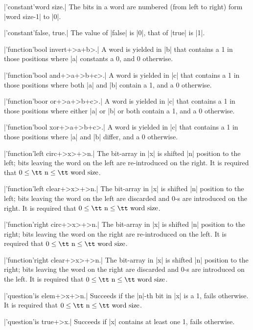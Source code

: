 \documentclass{article}
\begin{document}
\X\pp|'constant'word size.|\Y
The bits in a word are numbered (from left to right) form \pp|word size-1|
to \pp|0|.

\X\pp|'constant'false, true.|\Y
The value of \pp|false| is \pp|0|, that of \pp|true| is \pp|1|.

\X\pp|'function'bool invert+>a+b>.|\Y
A word is yielded in \pp|b| that contains a 1 in those positions where
\pp|a| constants a 0, and 0 otherwise.

\X\pp|'function'bool and+>a+>b+c>.|\Y
A word is yielded in \pp|c| that contains a 1 in those positions where both
\pp|a| and \pp|b| contain a 1, and a 0 otherwise.

\X\pp|'function'boor or+>a+>b+c>.|\Y
A word is yielded in \pp|c| that contains a 1 in those positions where
either \pp|a| or \pp|b| or both contain a 1, and a 0 otherwise.

\X\pp|'function'bool xor+>a+>b+c>.|\Y
A word is yielded in \pp|c| that contains a 1 in those positions where
\pp|a| and \pp|b| differ, and a 0 otherwise.

\smallskip

\X\pp|'function'left circ+>x>+>n.|\Y
The bit-array in \pp|x| is shifted \pp|n| position to the left; bits leaving
the word on the left are re-introduced on the right. It is required that
$0\le\mbox{\tt n}\le\mbox{\tt word size}$.

\X\pp|'function'left clear+>x>+>n.|\Y
The bit-array in \pp|x| is shifted \pp|n| position to the left; bits leaving
the word on the left are discarded and 0-s are introduced on the right. It is
required that $0\le\mbox{\tt n}\le\mbox{\tt word size}$.

\X\pp|'function'right circ+>x>+>n.|\Y
The bit-array in \pp|x| is shifted \pp|n| position to the right; bits leaving
the word on the right are re-introduced on the left. It is required that
$0\le\mbox{\tt n}\le\mbox{\tt word size}$.

\X\pp|'function'right clear+>x>+>n.|\Y
The bit-array in \pp|x| is shifted \pp|n| position to the right; bits leaving
the word on the right are discarded and 0-s are introduced on the left. It is
required that $0\le\mbox{\tt n}\le\mbox{\tt word size}$.

\X\pp|'question'is elem+>x+>n.|\Y
Succeeds if the \pp|n|-th bit in \pp|x| is a 1, fails otherwise. It is
required that $0\le\mbox{\tt n}\le\mbox{\tt word size}$.

\X\pp|'question'is true+>x.|\Y
Succeeds if \pp|x| contains at least one 1, fails otherwise.
\end{document}
